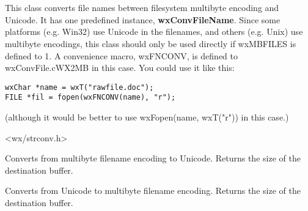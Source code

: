 %
%

\section{}\label{wxmbconvfile}

This class converts file names between filesystem multibyte encoding and
Unicode. It has one predefined instance, {\bf wxConvFileName}.
Since some platforms (e.g. Win32) use Unicode in the filenames,
and others (e.g. Unix) use multibyte encodings, this class should only
be used directly if wxMBFILES is defined to 1. A convenience macro,
wxFNCONV, is defined to wxConvFile.cWX2MB in this case. You could use it
like this:

\begin{verbatim}
wxChar *name = wxT("rawfile.doc");
FILE *fil = fopen(wxFNCONV(name), "r");
\end{verbatim}

(although it would be better to use wxFopen(name, wxT("r")) in this case.)




<wx/strconv.h>





\label{wxmbconvfilemb2wc}


Converts from multibyte filename encoding to Unicode. Returns the size of the destination buffer.

\label{wxmbconvfilewc2mb}


Converts from Unicode to multibyte filename encoding. Returns the size of the destination buffer.

